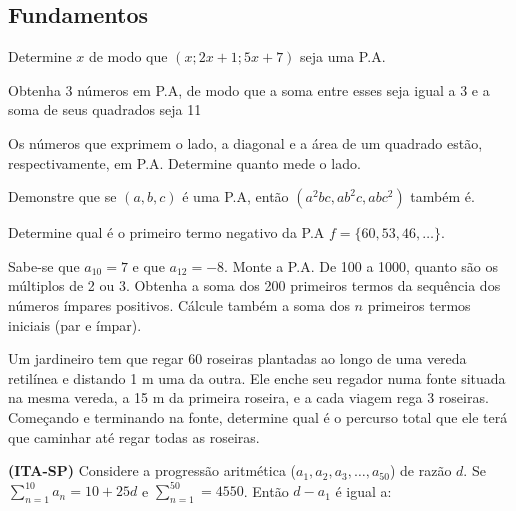 \documentclass[12pt, addpoints]{exam}
\begin{document}
\begin{center}
\end{center}

\subsection*{Fundamentos}

\begin{questions}
  \question [\half] Determine $x$ de modo que $(x ; 2x + 1 ; 5x + 7)$ seja uma P.A.

  \question [\half] Obtenha 3 números em P.A, de modo que a soma entre esses seja igual a 3 e a soma de seus quadrados seja 11

  \question [\half] Os números que exprimem o lado, a diagonal e a área de um quadrado estão, respectivamente, em P.A. Determine quanto mede o lado.

  \question [1 \half] Demonstre que se $(a, b, c)$ é uma P.A, então $(a^{2}bc, ab^{2}c, abc^{2})$ também é.

  \question[1] Determine qual é o primeiro termo negativo da P.A $f = \{60, 53, 46, \dots\}$.

  \question [\half] Sabe-se que $a_{10} = 7$ e que $a_{12} = -8$. Monte a P.A.
  \question [\half] De 100 a 1000, quanto são os múltiplos de 2 ou 3.
  \question [1] Obtenha a soma dos 200 primeiros termos da sequência dos números ímpares positivos. Cálcule também a soma dos $n$ primeiros termos iniciais (par e ímpar).

  \question[1] Um jardineiro tem que regar 60 roseiras plantadas ao longo de uma vereda retilínea e distando 1 m uma da outra. Ele enche seu regador numa fonte situada na mesma vereda, a 15 m da primeira roseira, e a cada viagem rega 3 roseiras. Começando e terminando na fonte, determine qual é o percurso total que ele terá que caminhar até regar todas as roseiras.

  \question[3] \textbf{(ITA-SP)} Considere a progressão aritmética ($a_{1}, a_{2}, a_{3}, \dots, a_{50}$) de razão $d$. Se $\displaystyle \sum_{n = 1}^{10} a_{n} = 10 + 25d$ e $\displaystyle \sum_{n = 1}^{50} = 4550$. Então $d - a_{1}$ é igual a:
  \vspace{0.2cm}
\end{questions}
\end{document}
